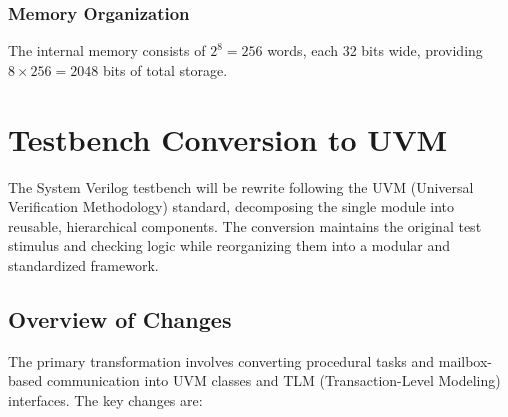 \documentclass{article}
\begin{document}
\subsubsection{Memory Organization}

The internal memory consists of $2^{8} = 256$ words, each 32 bits wide, providing $8 \times 256 = 2048$ bits of total storage.

\section{Testbench Conversion to UVM}

The System Verilog testbench will be rewrite following the UVM (Universal Verification Methodology) standard, decomposing the single module into reusable, hierarchical components. The conversion maintains the original test stimulus and checking logic while reorganizing them into a modular and standardized framework.

\subsection{Overview of Changes}

The primary transformation involves converting procedural tasks and mailbox-based communication into UVM classes and TLM (Transaction-Level Modeling) interfaces. The key changes are:
\end{document}
